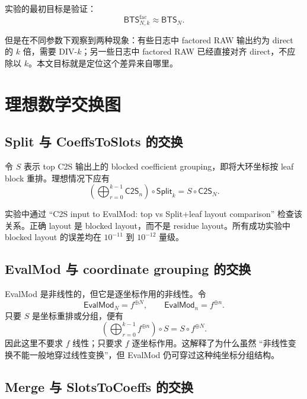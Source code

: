 \documentclass[UTF8,a4paper,11pt]{ctexart}
\newcommand{\CtwoS}{\mathsf{C2S}}
\newcommand{\EvalMod}{\mathsf{EvalMod}}
\newcommand{\Split}{\mathsf{Split}}
\newcommand{\BTS}{\mathsf{BTS}}
\begin{document}
实验的最初目标是验证：
\begin{equation}
\BTS_{N,k}^{\mathrm{fac}}
\approx
\BTS_N.
\end{equation}

但是在不同参数下观察到两种现象：有些日志中 factored RAW 输出约为 direct 的 $k$ 倍，需要 DIV-$k$；另一些日志中 factored RAW 已经直接对齐 direct，不应除以 $k$。本文目标就是定位这个差异来自哪里。

\section{理想数学交换图}

\subsection{Split 与 CoeffsToSlots 的交换}

令 $S$ 表示 top C2S 输出上的 blocked coefficient grouping，即将大环坐标按 leaf block 重排。理想情况下应有
\begin{equation}
\boxed{
\left(\bigoplus_{r=0}^{k-1}\CtwoS_n\right)\circ\Split_k
=
S\circ\CtwoS_N.
}
\end{equation}

实验中通过 ``C2S input to EvalMod: top vs Split+leaf layout comparison'' 检查该关系。正确 layout 是 blocked layout，而不是 residue layout。所有成功实验中 blocked layout 的误差均在 $10^{-11}$ 到 $10^{-12}$ 量级。

\subsection{EvalMod 与 coordinate grouping 的交换}

EvalMod 是非线性的，但它是逐坐标作用的非线性。令
\begin{equation}
\EvalMod_N=f^{\oplus N},
\qquad
\EvalMod_n=f^{\oplus n}.
\end{equation}
只要 $S$ 是坐标重排或分组，便有
\begin{equation}
\boxed{
\left(\bigoplus_{r=0}^{k-1}f^{\oplus n}\right)\circ S
=
S\circ f^{\oplus N}.
}
\end{equation}
因此这里不要求 $f$ 线性；只要求 $f$ 逐坐标作用。这解释了为什么虽然 ``非线性变换不能一般地穿过线性变换''，但 EvalMod 仍可穿过这种纯坐标分组结构。

\subsection{Merge 与 SlotsToCoeffs 的交换}
\end{document}
